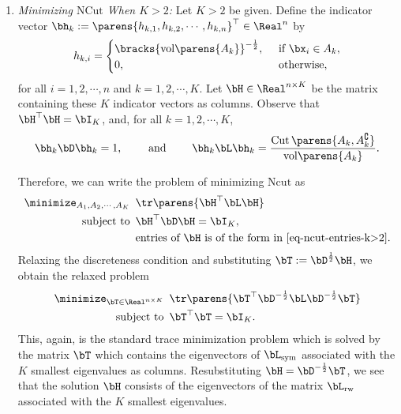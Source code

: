 \documentclass[12pt]{article}
\begin{document}
\begin{enumerate}[label=\textbf{\arabic*.}]
\begin{enumerate}
		\item \textit{Minimizing $\mathrm{NCut}$ When $K > 2$:} Let $K > 2$ be given. Define the indicator vector $\bh_k := \parens{h_{k,1}, h_{k,2}, \cdots, h_{k,n}}^\top \in \Real^n$ by 
		\begin{align}\label{eq-ncut-entries-k>2}
			h_{k, i} = \begin{cases}
				\bracks{\mathrm{vol} \parens{A_k}}^{-\frac{1}{2}}, & \, \text{ if } \bx_i \in A_k, \\ 
				0, & \, \text{ otherwise}, 
			\end{cases}
		\end{align}
		for all $i = 1, 2, \cdots, n$ and $k = 1, 2, \cdots, K$. Let $\bH \in \Real^{n \times K}$ be the matrix containing these $K$ indicator vectors as columns. Observe that $\bH^\top \bH = \bI_K$, and, for all $k = 1, 2, \cdots, K$, 
		\begin{align*}
			 \bh_k \bD \bh_k = 1, \qquad \text{ and } \qquad \bh_k \bL \bh_k = \frac{\mathrm{Cut} \, \parens{A_k, A_k^{\complement}}}{\mathrm{vol} \parens{A_k}}. 
		\end{align*}
		
		Therefore, we can write the problem of minimizing $\mathrm{Ncut}$ as 
		\begin{align*}
			\minimize_{A_1, A_2, \cdots, A_K} \ & \, \tr \parens{\bH^\top \bL \bH} \\ 
			\text{subject to } & \, \bH^\top \bD \bH = \bI_K, \\ 
			& \, \text{entries of $\bH$ is of the form in \eqref{eq-ncut-entries-k>2}}. 
		\end{align*}
		Relaxing the discreteness condition and substituting $\bT := \bD^{\frac{1}{2}} \bH$, we obtain the relaxed problem 
		\begin{align*}
			\minimize_{\bT \in \Real^{n \times K}} \ & \, \tr \parens{\bT^\top \bD^{-\frac{1}{2}} \bL \bD^{-\frac{1}{2}} \bT} \\ 
			\text{subject to } & \, \bT^\top \bT = \bI_K. 
		\end{align*}
		This, again, is the standard trace minimization problem which is solved by the matrix $\bT$ which contains the eigenvectors of $\bL_{\mathrm{sym}}$ associated with the $K$ smallest eigenvalues as columns. Resubstituting $\bH = \bD^{-\frac{1}{2}} \bT$, we see that the solution $\bH$ consists of the eigenvectors of the matrix $\bL_{\mathrm{rw}}$ associated with the $K$ smallest eigenvalues. 
		
	\end{enumerate}
	

\end{enumerate}
\end{document}
